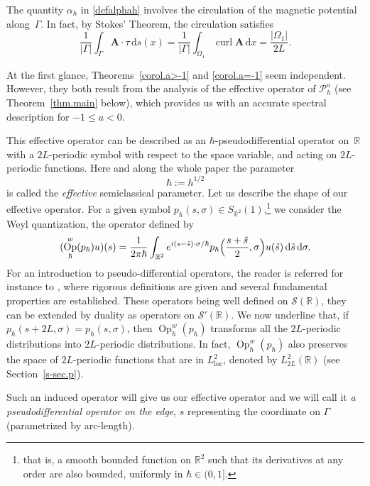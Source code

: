 \documentclass[10pt]{amsart}
\newcommand{\rd}{\,\mathrm{d}}
\newcommand{\loc}{\mathrm{loc}}
\DeclareMathOperator{\curl}{curl}
\DeclareMathOperator{\Op}{Op}
\newcommand{\cP}{\mathcal{P}}
\theoremstyle{plain}
\theoremstyle{definition}
\newcommand{\A}{\boldsymbol{A}}
\newcommand{\R}{\mathbb{R}}
\begin{document}
The quantity $\alpha_h$ in \eqref{defalphah} involves the circulation of the magnetic potential along~$\Gamma$. In fact, by Stokes' Theorem, the circulation satisfies
\[
\frac1{|\Gamma|}\int_\Gamma \A\cdot \tau \rd s(x)=\frac1{|\Gamma|}\int_{\Omega_1} \curl\A \rd x= \frac{|\Omega_1|}{2L}.
\]

At the first glance, Theorems~\ref{corol.a>-1} and \ref{corol.a=-1} seem independent. However, they both result from the analysis of the effective operator of $\cP_h^a$ (see Theorem~\ref{thm.main} below), which provides us with an accurate spectral description for $-1\leq a<0$.

This effective operator can be described as an $\hbar$-pseudodifferential operator on~$\R$ with a $2L$-periodic symbol with respect to the space variable, and acting on $2L$\nobreakdash-periodic functions. Here and along the whole paper the parameter
\begin{equation}
\hbar:=h^{1/2}
\end{equation}
is called the \emph{effective} semiclassical parameter. Let us describe the shape of our effective operator. For a given symbol $p_\hbar(s,\sigma)\in S_{\R^2}(1)$,\footnote{that is, a smooth bounded function on $\R^2$ such that its derivatives at any order are also bounded, uniformly in $\hbar\in(0,1]$.} we consider the Weyl quantization, \ie the operator defined by
\begin{equation}\label{eq.ph-w-intro}
(\Op_\hbar^w(p_\hbar) u)(s)=\frac{1}{2\pi\hbar} \int_{\R^2} e^{i(s-\tilde s)\cdot \sigma/\hbar} p_\hbar \Bigl(\frac{s+\tilde s}{2}, \sigma\Bigr)u(\tilde s) \rd \tilde s \rd \sigma.
\end{equation}
For an introduction to pseudo-differential operators, the reader is referred for instance to \cite{Zworski}, where rigorous definitions are given and several fundamental properties are established. These operators being well defined on $\mathcal S(\mathbb R)$, they can be extended by duality as operators on $\mathcal S'(\mathbb R)$. We now underline that, if $p_{\hbar}(s+2L,\sigma)=p_{\hbar}(s,\sigma)$, then $\Op_\hbar^w(p_\hbar)$ transforms all the $2L$-periodic distributions into $2L$-periodic distributions. In fact, $\Op_\hbar^w(p_\hbar)$ also preserves the space of $2L$-periodic functions that are in $L^2_{\loc}$, denoted by $L^2_{2L}(\R)$ (see Section~\ref{s-sec.p}).

Such an induced operator will give us our effective operator and we will call it \emph{a pseudodifferential operator on the edge}, $s$ representing the coordinate on $\Gamma$ (parametrized by arc-length).
\end{document}

